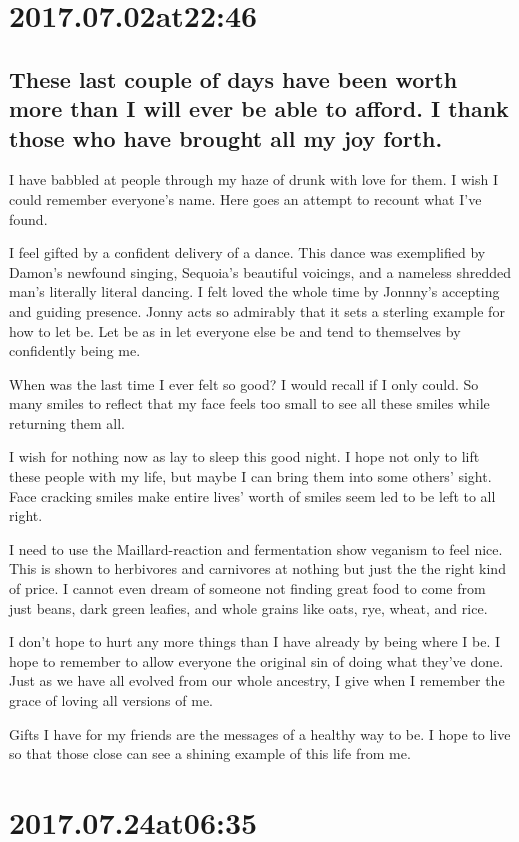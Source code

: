 \begin{enumerate}
\begin{enumerate}
\section*{ 2017.07.02at22:46 }
\subsection*{ These last couple of days have been worth more than I will ever be able to afford. I thank those who have brought all my joy forth. }
I have babbled at people through my haze of drunk with love for them. I wish I could remember everyone's name. Here goes an attempt to recount what I've found.

I feel gifted by a confident delivery of a dance. This dance was exemplified by Damon's newfound singing, Sequoia's beautiful voicings, and a nameless shredded man's literally literal dancing. I felt loved the whole time by Jonnny's accepting and guiding presence. Jonny acts so admirably that it sets a sterling example for how to let be. Let be as in let everyone else be and tend to themselves by confidently being me.

When was the last time I ever felt so good? I would recall if I only could. So many smiles to reflect that my face feels too small to see all these smiles while returning them all.

I wish for nothing now as lay to sleep this good night. I hope not only to lift these people with my life, but maybe I can bring them into some others' sight. Face cracking smiles make entire lives' worth of smiles seem led to be left to all right.

I need to use the Maillard-reaction and fermentation show veganism to feel nice. This is shown to herbivores and carnivores at nothing but just the the right kind of price. I cannot even dream of someone not finding great food to come from just beans, dark green leafies, and whole grains like oats, rye, wheat, and rice.

I don't hope to hurt any more things than I have already by being where I be. I hope to remember to allow everyone the original sin of doing what they've done. Just as we have all evolved from our whole ancestry, I give when I remember the grace of loving all versions of me.

Gifts I have for my friends are the messages of a healthy way to be. I hope to live so that those close can see a shining example of this life from me.

\section*{ 2017.07.24at06:35 }

\end{enumerate}
\end{enumerate}
